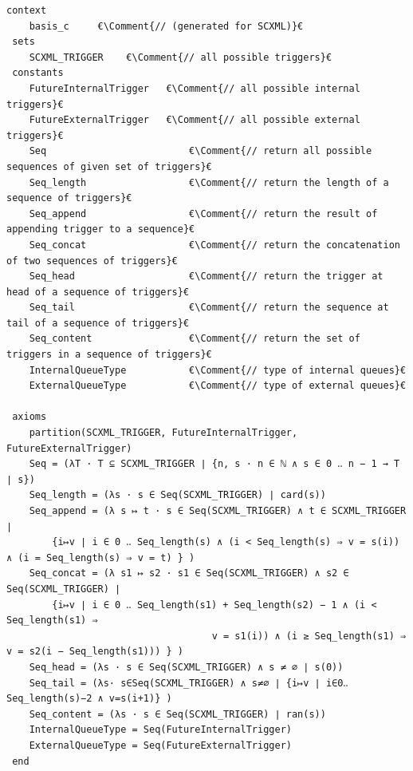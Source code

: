  \begin{lstlisting}[caption={Abstract basis context},label={lst:BasisContext}, language=Event-B, tabsize=8, escapechar=€, frame=single, basicstyle=\rmfamily\scriptsize, belowskip=-2.0 \baselineskip, float=t]
 context
 	basis_c 	€\Comment{// (generated for SCXML)}€
 sets
 	SCXML_TRIGGER	 €\Comment{// all possible triggers}€
 constants
 	FutureInternalTrigger	€\Comment{// all possible internal triggers}€
 	FutureExternalTrigger	€\Comment{// all possible external triggers}€
 	Seq							€\Comment{// return all possible sequences of given set of triggers}€
 	Seq_length					€\Comment{// return the length of a sequence of triggers}€
 	Seq_append					€\Comment{// return the result of appending trigger to a sequence}€
 	Seq_concat					€\Comment{// return the concatenation of two sequences of triggers}€
 	Seq_head					€\Comment{// return the trigger at head of a sequence of triggers}€
 	Seq_tail					€\Comment{// return the sequence at tail of a sequence of triggers}€
 	Seq_content					€\Comment{// return the set of triggers in a sequence of triggers}€
 	InternalQueueType			€\Comment{// type of internal queues}€
 	ExternalQueueType			€\Comment{// type of external queues}€
 	
 axioms
 	partition(SCXML_TRIGGER, FutureInternalTrigger, FutureExternalTrigger) 
 	Seq = (λT · T ⊆ SCXML_TRIGGER ∣ {n, s · n ∈ ℕ ∧ s ∈ 0 ‥ n − 1 → T ∣ s})
 	Seq_length = (λs · s ∈ Seq(SCXML_TRIGGER) ∣ card(s))
 	Seq_append = (λ s ↦ t · s ∈ Seq(SCXML_TRIGGER) ∧ t ∈ SCXML_TRIGGER ∣ 
 		{i↦v ∣ i ∈ 0 ‥ Seq_length(s) ∧ (i < Seq_length(s) ⇒ v = s(i)) ∧ (i = Seq_length(s) ⇒ v = t) } )
	Seq_concat = (λ s1 ↦ s2 · s1 ∈ Seq(SCXML_TRIGGER) ∧ s2 ∈ Seq(SCXML_TRIGGER) ∣ 
		{i↦v ∣ i ∈ 0 ‥ Seq_length(s1) + Seq_length(s2) − 1 ∧ (i < Seq_length(s1) ⇒ 
									v = s1(i)) ∧ (i ≥ Seq_length(s1) ⇒ v = s2(i − Seq_length(s1))) } )
	Seq_head = (λs · s ∈ Seq(SCXML_TRIGGER) ∧ s ≠ ∅ ∣ s(0))								
	Seq_tail = (λs· s∈Seq(SCXML_TRIGGER) ∧ s≠∅ ∣ {i↦v ∣ i∈0‥Seq_length(s)−2 ∧ v=s(i+1)} )	
	Seq_content = (λs · s ∈ Seq(SCXML_TRIGGER) ∣ ran(s))
	InternalQueueType = Seq(FutureInternalTrigger)
	ExternalQueueType = Seq(FutureExternalTrigger)
 end
 \end{lstlisting}	

